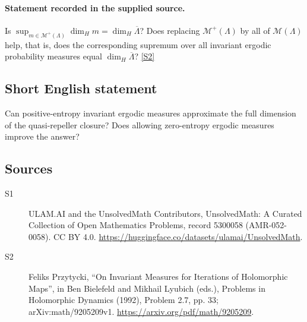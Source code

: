 \documentclass[11pt]{article}
\newcommand{\sref}[2]{\hyperlink{source:#1:#2}{[S#2]}}
\begin{document}
\paragraph{Statement recorded in the supplied source.}
Is $\sup_{m\in\mathcal M^+(\Lambda)}\dim_Hm=\dim_H\overline\Lambda$? Does replacing $\mathcal M^+(\Lambda)$ by all of $\mathcal M(\Lambda)$ help, that is, does the corresponding supremum over all invariant ergodic probability measures equal $\dim_H\overline\Lambda$? \sref{5300058}{2}
\subsection{Short English statement}
Can positive-entropy invariant ergodic measures approximate the full dimension of the quasi-repeller closure? Does allowing zero-entropy ergodic measures improve the answer?
\subsection{Sources}
\begin{description}
\item[\hypertarget{source:5300058:1}{S1}] ULAM.AI and the UnsolvedMath Contributors, UnsolvedMath: A Curated Collection of Open Mathematics Problems, record 5300058 (AMR-052-0058). CC BY 4.0. \url{https://huggingface.co/datasets/ulamai/UnsolvedMath}.
\item[\hypertarget{source:5300058:2}{S2}] Feliks Przytycki, ``On Invariant Measures for Iterations of Holomorphic Maps'', in Ben Bielefeld and Mikhail Lyubich (eds.), Problems in Holomorphic Dynamics (1992), Problem 2.7, pp. 33; arXiv:math/9205209v1. \url{https://arxiv.org/pdf/math/9205209}.
\end{description}
\label{end:5300058}
\end{document}

